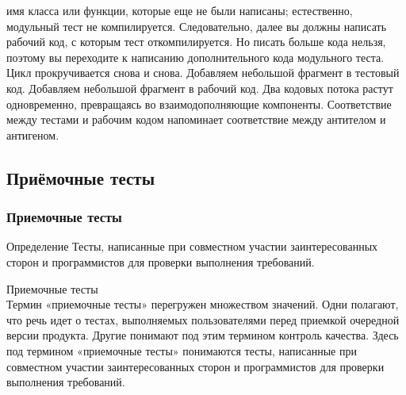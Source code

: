 \documentclass{../industrial-development}
\begin{document}
имя класса или функции, которые еще не были написаны; естественно, модульный тест не компилируется. Следовательно, далее вы должны написать рабочий код, с которым тест откомпилируется. Но писать больше кода нельзя, поэтому вы переходите к написанию дополнительного кода модульного теста.\\
Цикл прокручивается снова и снова. Добавляем небольшой фрагмент в тестовый код. Добавляем небольшой фрагмент в рабочий код. Два кодовых потока растут одновременно, превращаясь во взаимодополняющие компоненты. Соответствие между тестами и рабочим кодом напоминает соответствие между антителом и антигеном.

\subsection{Приёмочные тесты}
\begin{frame} \frametitle{Приемочные тесты}
  \begin{block}{Определение}
	Тесты, написанные при совместном участии заинтересованных сторон и программистов для проверки выполнения требований.
  \end{block}
\end{frame}
\lecturenotes
Приемочные тесты\\
Термин «приемочные тесты» перегружен множеством значений. Одни полагают, что речь идет о тестах, выполняемых пользователями перед приемкой очередной версии продукта. Другие понимают под этим термином контроль качества. Здесь под термином «приемочные тесты» понимаются тесты, написанные при совместном участии заинтересованных сторон и программистов для проверки выполнения
требований.
\end{document}
